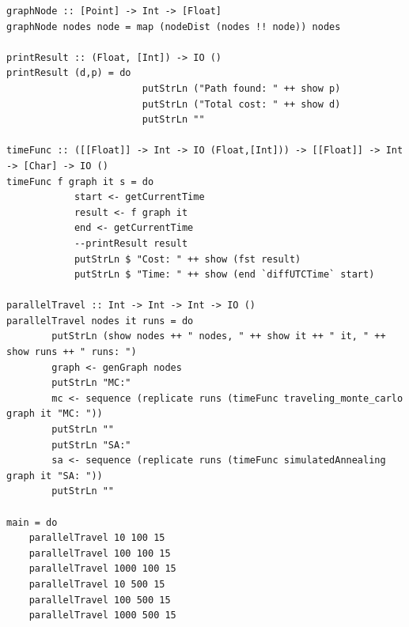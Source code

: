 \documentclass{article}
\begin{document}
\begin{appendices}
\begin{framed}
\begin{verbatim}
graphNode :: [Point] -> Int -> [Float]
graphNode nodes node = map (nodeDist (nodes !! node)) nodes

printResult :: (Float, [Int]) -> IO ()
printResult (d,p) = do
                        putStrLn ("Path found: " ++ show p)
                        putStrLn ("Total cost: " ++ show d)
                        putStrLn ""

timeFunc :: ([[Float]] -> Int -> IO (Float,[Int])) -> [[Float]] -> Int -> [Char] -> IO ()
timeFunc f graph it s = do
            start <- getCurrentTime
            result <- f graph it
            end <- getCurrentTime
            --printResult result
            putStrLn $ "Cost: " ++ show (fst result)
            putStrLn $ "Time: " ++ show (end `diffUTCTime` start)

parallelTravel :: Int -> Int -> Int -> IO ()
parallelTravel nodes it runs = do
        putStrLn (show nodes ++ " nodes, " ++ show it ++ " it, " ++ show runs ++ " runs: ")
        graph <- genGraph nodes
        putStrLn "MC:"
        mc <- sequence (replicate runs (timeFunc traveling_monte_carlo graph it "MC: "))
        putStrLn ""
        putStrLn "SA:"
        sa <- sequence (replicate runs (timeFunc simulatedAnnealing graph it "SA: "))
        putStrLn ""

main = do
    parallelTravel 10 100 15
    parallelTravel 100 100 15
    parallelTravel 1000 100 15
    parallelTravel 10 500 15
    parallelTravel 100 500 15
    parallelTravel 1000 500 15
\end{verbatim}
\end{framed}

\end{appendices}
\end{document}
